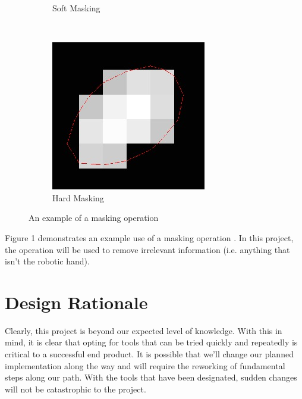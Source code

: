 \documentclass[10pt,journal,compsoc, draftclsnofoot,onecolumn]{IEEEtran}
\begin{document}
\begin{figure}[h!]
\begin{subfigure}[b]{0.15\textwidth}
        \caption{Soft Masking}
    \end{subfigure}
    ~ %
    \begin{subfigure}[b]{0.15\textwidth}
        \includegraphics[width=\textwidth]{hard_masking.jpg}
        \caption{Hard Masking}
    \end{subfigure}
    \caption{An example of a masking operation}\label{fig:animals}
\end{figure}

\noindent
Figure 1 demonstrates an example use of a masking operation \cite{2:online}.
In this project, the operation will be used to remove irrelevant information (i.e. anything that isn't the robotic hand). 

\section{Design Rationale}
Clearly, this project is beyond our expected level of knowledge.
With this in mind, it is clear that opting for tools that can be tried quickly and repeatedly is critical to a successful end product.
It is possible that we'll change our planned implementation along the way and will require the reworking of fundamental steps along our path.
With the tools that have been designated, sudden changes will not be catastrophic to the project.
\end{document}
